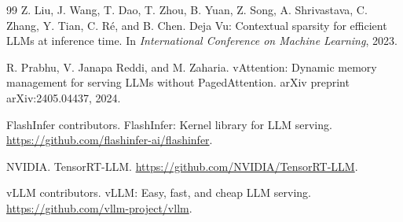 \documentclass[10pt]{article}
\begin{document}
\begin{thebibliography}{99}
Z. Liu, J. Wang, T. Dao, T. Zhou, B. Yuan, Z. Song, A. Shrivastava, C. Zhang,
Y. Tian, C. R{\'e}, and B. Chen.
\newblock Deja Vu: Contextual sparsity for efficient LLMs at inference time.
\newblock In \emph{International Conference on Machine Learning}, 2023.

R. Prabhu, V. Janapa Reddi, and M. Zaharia.
\newblock vAttention: Dynamic memory management for serving LLMs without PagedAttention.
\newblock arXiv preprint arXiv:2405.04437, 2024.

FlashInfer contributors.
\newblock FlashInfer: Kernel library for LLM serving.
\newblock \url{https://github.com/flashinfer-ai/flashinfer}.

NVIDIA.
\newblock TensorRT-LLM.
\newblock \url{https://github.com/NVIDIA/TensorRT-LLM}.

vLLM contributors.
\newblock vLLM: Easy, fast, and cheap LLM serving.
\newblock \url{https://github.com/vllm-project/vllm}.

\end{thebibliography}
\end{document}
